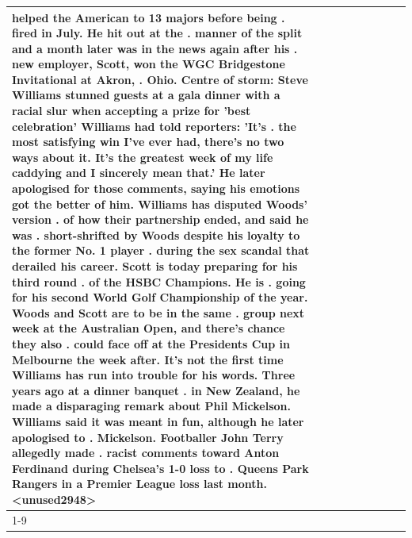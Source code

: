 \begin{table}[H]
\begin{tabular}{lllrlllll}
helped the American to 13 majors before being . fired in July. He hit out at the . manner of the split and a month later was in the news again after his . new employer, Scott, won the WGC Bridgestone Invitational at Akron, . Ohio. Centre of storm: Steve Williams stunned guests at a gala dinner with a racial slur when accepting a prize for 'best celebration' Williams had told reporters: 'It's . the most satisfying win I've ever had, there's no two ways about it. It's the greatest week of my life caddying and I sincerely mean that.' He later apologised for those comments, saying his emotions got the better of him. Williams has disputed Woods' version . of how their partnership ended, and said he was . short-shrifted by Woods despite his loyalty to the former No. 1 player . during the sex scandal that derailed his career. Scott is today preparing for his third round . of the HSBC Champions. He is . going for his second World Golf Championship of the year. Woods and Scott are to be in the same . group next week at the Australian Open, and there's chance they also . could face off at the Presidents Cup in Melbourne the week after. It's not the first time Williams has run into trouble for his words. Three years ago at a dinner banquet . in New Zealand, he made a disparaging remark about Phil Mickelson. Williams said it was meant in fun, although he later apologised to . Mickelson. Footballer John Terry allegedly made . racist comments toward Anton Ferdinand during Chelsea's 1-0 loss to . Queens Park Rangers in a Premier League loss last month.<unused2948> \\
\cline{1-9}

\end{tabular}
\end{table}
